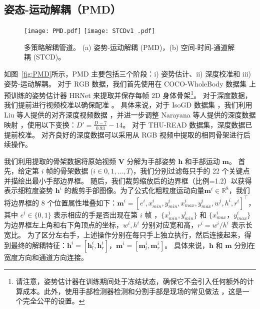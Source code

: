 \subsection{姿态-运动解耦（PMD）}
\label{sec:pose-motion}
\begin{figure}[tb]
\centering
\subcaptionbox{\label{fig:PMD}}
{\texttt{[image: PMD.pdf]}}
\subcaptionbox{\label{fig:STCD}}
{\texttt{[image: STCDv1 .pdf]}}
\caption{多策略解耦管道。 (a) 姿势-运动解耦 (PMD)，(b) 空间-时间-通道解耦 (STCD)。}
\label{fig:handdecomp}
\end{figure}

如图~\ref{fig:PMD}所示，PMD 主要包括三个阶段：i) 姿势估计、ii) 深度校准和 iii) 姿势-运动解耦。
对于 RGB 数据，我们首先使用在 COCO-WholeBody 数据集 \cite{jin2020whole} 上预训练的姿势估计器 HRNet \cite{sun2019deep} 来提取并保存每帧 2D 身体骨架\footnote{请注意，姿势估计器在训练期间处于冻结状态，确保它不会引入任何额外的计算成本。此外，使用手部检测器检测和分割手部是现场的常见做法 \cite{AVOLA2022108762,zhou2021regional,chen2022multi}，这是一个完全公平的设置。}。
对于深度数据，我们提前进行视频校准以确保配准 \cite{liu2017continuous}。
具体来说，对于 IsoGD 数据集 \cite{wan2016chalearn}，我们利用 Liu 等人提供的对齐深度视频数据 \cite{liu2017continuous}，并进一步调整 Narayana 等人提供的深度数据映射 \cite{narayana2018focus}，使用以下变换：$D'=\frac{D-7}{0.93}-14$。
对于 THU-READ 数据集，深度数据已提前校准。
对齐良好的深度数据可以采用从 RGB 视频中提取的相同骨架进行后续操作。

我们利用提取的骨架数据将原始视频 $\mathbf{V}$ 分解为手部姿势 $\mathbf{h}$ 和手部运动 $\mathbf{m}$。
首先，给定第 $i$ 帧的骨架数据 ($i \in 0, 1, ..., T$)，我们分别过滤每只手的 22 个关键点并描绘出最小手部边界框。
随后，我们裁剪缩放后的边界框（比例=1.2）以获得表示细粒度姿势 $\mathbf{h}^{i}$ 的裁剪手部图像。为了公式化粗粒度运动向量$\mathbf{m}^{i} \in \mathbb{R}^{8}$，我们将边界框的 8 个位置属性堆叠如下：$\mathbf{m}^{i} = \left[e^{i}, x^{i}_{min}, y^{i}_{min}, x^{i}_{max}, y^{i}_{max}, w^{i}, h^{i}, r^{i}\right]^{\top}$，其中 $e^{i} \in \{0, 1\}$ 表示相应的手是否出现在第 $i$ 帧%
，$\{x^{i}_{min}, y^{i}_{min}\}$ 和 $\{x^{i}_{max}， y^{i}_{max}\}$ 为边界框左上角和右下角顶点的坐标，$w^{i}, h^{i}$ 分别对应宽和高，$r^{i}=w^{i}/h^{i}$ 表示长宽比。
为了区分左右手，上述操作分别在每只手上独立执行，然后连接起来，得到最终的解耦特征：$\mathbf{h}^{i} = \left[\mathbf{h}^{i}_l, \mathbf{h}^{i}_r\right]$，$\mathbf{m}^{i} = \left[\mathbf{m}^{i}_l, \mathbf{m}^{i}_r\right]$。
具体来说，$\mathbf{h}$ 和 $\mathbf{m}$ 分别在宽度方向和通道方向连接。

